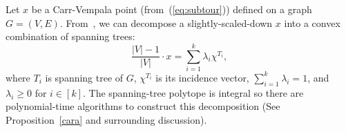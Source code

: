 Let $x$ be a Carr-Vempala point (from~(\ref{eq:subtour})) defined on a graph $G=(V,E)$.  From~\cite{Vygen12}, we can decompose a slightly-scaled-down $x$ into a convex combination of spanning trees:
\begin{equation}
\label{eq:tree-decomp}
\frac{|V|-1}{|V|}\cdot x= \sum_{i=1}^{k}\lambda_i\chi^{T_i},
\end{equation}
where $T_i$ is spanning tree of $G$, $\chi^{T_i}$ is its incidence vector, $\sum_{i=1}^{k}\lambda_i=1$, and $\lambda_i\geq 0$ for $i\in [k]$. The spanning-tree polytope is integral so there are polynomial-time algorithms to construct this decomposition (See Proposition~\ref{cara} and surrounding discussion).

